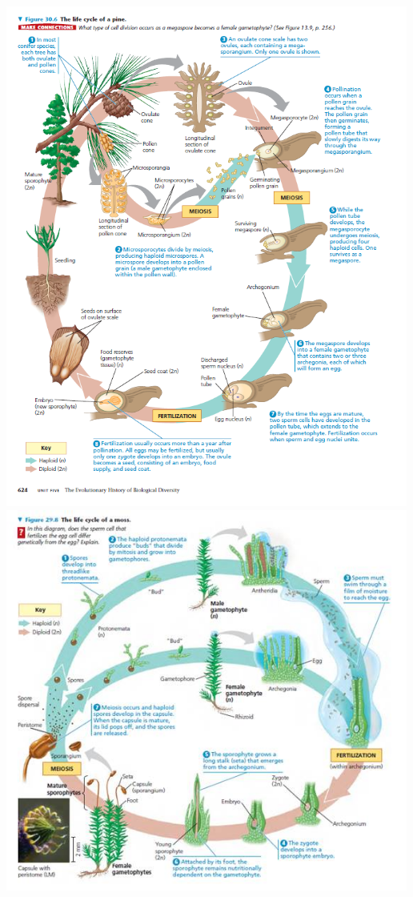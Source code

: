 \documentclass[]{book}
\begin{document}
\includegraphics[width=500px]{static/augalai/plikasekliai}
\includegraphics[width=500px]{static/augalai/samanunai}
\end{document}
